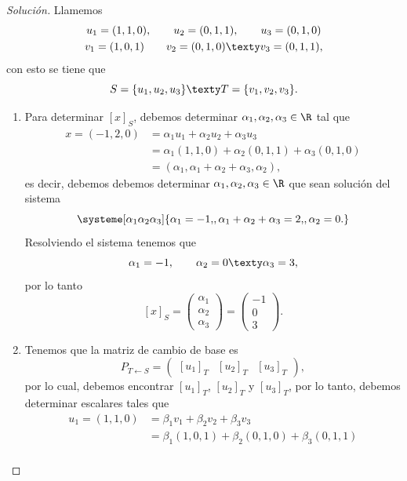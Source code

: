 \documentclass[a4,11pt]{aleph-notas}
\begin{document}
\begin{proof}[Solución]
Llamemos
\begin{gather*}
    u_1 = (1,1,0),\qquad
    u_2 = (0,1,1),\qquad
    u_3 = (0,1,0)\\
    v_1 = (1,0,1)\qquad
    v_2 = (0,1,0)\texty
    v_3 = (0,1,1),
\end{gather*}
con esto se tiene que
\[
    S = \{u_1,u_2,u_3\}
    \texty
    T = \{v_1,v_2,v_3\}.
\]
\begin{enumerate}[leftmargin=*]
\item 
    Para determinar $[x]_S$, debemos determinar $\alpha_1,\alpha_2,\alpha_3\in\R$ tal que 
    \begin{align*}
        x = (-1,2,0) & = \alpha_1 u_1+\alpha_2u_2+\alpha_3u_3 \\
        & = \alpha_1 (1,1,0)+\alpha_2(0,1,1)+\alpha_3(0,1,0)\\
        & = (\alpha_1,\alpha_1+\alpha_2+\alpha_3,\alpha_2),
    \end{align*}
    es decir, debemos debemos determinar $\alpha_1,\alpha_2,\alpha_3\in\R$ que sean solución del sistema
    \[
        \systeme[\alpha_1\alpha_2\alpha_3]{
        \alpha_1 = -1{,},
        \alpha_1+\alpha_2+\alpha_3 = 2{,},
        \alpha_2 = 0{.}
        }
    \]
    Resolviendo el sistema tenemos que
    \[
        \alpha_1 = -1,\qquad
        \alpha_2 = 0\texty
        \alpha_3 = 3,
    \]
    por lo tanto
    \[
        [x]_S 
        = \begin{pmatrix} \alpha_1\\ \alpha_2 \\ \alpha_3 \end{pmatrix}
        = \begin{pmatrix} -1\\ 0 \\ 3 \end{pmatrix}.
    \]
\item
    Tenemos que la matriz de cambio de base es 
    \[
        P_{T\leftarrow S} = 
        \begin{pmatrix}
        [u_1]_T & [u_2]_T & [u_3]_T
        \end{pmatrix},
    \]
    por lo cual, debemos encontrar $[u_1]_T$, $[u_2]_T$ y $[u_3]_T$, por lo tanto, debemos determinar escalares tales que
    \begin{align*}
        u_1 = (1,1,0) 
        & = \beta_1 v_1+\beta_2v_2+\beta_3v_3 \\
        & = \beta_1 (1,0,1) +\beta_2(0,1,0) +\beta_3(0,1,1)\\

\end{align*}
\end{enumerate}
\end{proof}
\end{document}
